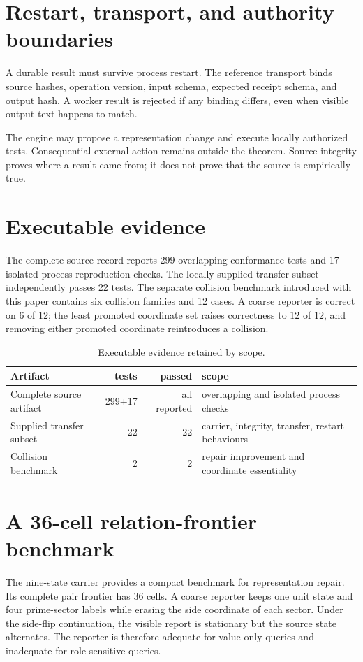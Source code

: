 \documentclass[11pt,a4paper]{article}
\begin{document}
\section{Restart, transport, and authority boundaries}
A durable result must survive process restart. The reference transport binds source hashes, operation version, input schema, expected receipt schema, and output hash. A worker result is rejected if any binding differs, even when visible output text happens to match.

The engine may propose a representation change and execute locally authorized tests. Consequential external action remains outside the theorem. Source integrity proves where a result came from; it does not prove that the source is empirically true.

\section{Executable evidence}
The complete source record reports 299 overlapping conformance tests and 17 isolated-process reproduction checks. The locally supplied transfer subset independently passes 22 tests. The separate collision benchmark introduced with this paper contains six collision families and 12 cases. A coarse reporter is correct on 6 of 12; the least promoted coordinate set raises correctness to 12 of 12, and removing either promoted coordinate reintroduces a collision.

\begin{table}[H]\centering
\caption{Executable evidence retained by scope.}
\begin{tabular}{lrrl}
\toprule
Artifact & tests & passed & scope\\\midrule
Complete source artifact & 299+17 & all reported & overlapping and isolated process checks\\
Supplied transfer subset & 22 & 22 & carrier, integrity, transfer, restart behaviours\\
Collision benchmark & 2 & 2 & repair improvement and coordinate essentiality\\
\bottomrule
\end{tabular}
\end{table}

\section{A 36-cell relation-frontier benchmark}
The nine-state carrier provides a compact benchmark for representation repair. Its complete pair frontier has 36 cells. A coarse reporter keeps one unit state and four prime-sector labels while erasing the side coordinate of each sector. Under the side-flip continuation, the visible report is stationary but the source state alternates. The reporter is therefore adequate for value-only queries and inadequate for role-sensitive queries.
\end{document}
